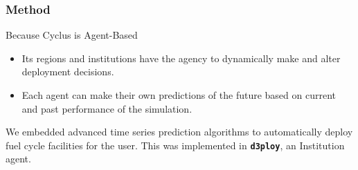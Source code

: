 

\begin{frame}
        \frametitle{Method}
        \begin{block}{Because Cyclus is Agent-Based}
                \begin{itemize}
                        \item Its regions and institutions have the agency to dynamically make and alter deployment decisions.
                        \item Each agent can make their own predictions of the future based on current and past performance of the simulation.
                \end{itemize}

                We embedded advanced time series prediction algorithms to automatically
                deploy fuel cycle facilities for the user. This was implemented
                in \textbf{\texttt{d3ploy}}, an Institution agent.
        \end{block}
\end{frame}

%

